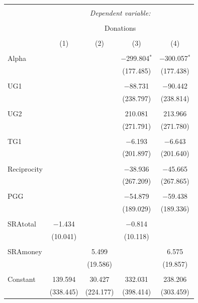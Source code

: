 \documentclass[12pt]{article}
\begin{document}
\begin{table}[!htbp] \centering 
  \caption{} 
  \label{} 
        \begin{adjustbox}{width=\textwidth}
\begin{tabular}{@{\extracolsep{5pt}}lcccc} 
\\[-1.8ex]\hline 
\hline \\[-1.8ex] 
 & \multicolumn{4}{c}{\textit{Dependent variable:}} \\ 
\cline{2-5} 
\\[-1.8ex] & \multicolumn{4}{c}{Donations} \\ 
\\[-1.8ex] & (1) & (2) & (3) & (4)\\ 
\hline \\[-1.8ex] 
 Alpha &  &  & $-$299.804$^{*}$ & $-$300.057$^{*}$ \\ 
  &  &  & (177.485) & (177.438) \\ 
  & & & & \\ 
 UG1 &  &  & $-$88.731 & $-$90.442 \\ 
  &  &  & (238.797) & (238.814) \\ 
  & & & & \\ 
 UG2 &  &  & 210.081 & 213.966 \\ 
  &  &  & (271.791) & (271.780) \\ 
  & & & & \\ 
 TG1 &  &  & $-$6.193 & $-$6.643 \\ 
  &  &  & (201.897) & (201.640) \\ 
  & & & & \\ 
 Reciprocity &  &  & $-$38.936 & $-$45.665 \\ 
  &  &  & (267.209) & (267.865) \\ 
  & & & & \\ 
 PGG &  &  & $-$54.879 & $-$59.438 \\ 
  &  &  & (189.029) & (189.336) \\ 
  & & & & \\ 
 SRAtotal & $-$1.434 &  & $-$0.814 &  \\ 
  & (10.041) &  & (10.118) &  \\ 
  & & & & \\ 
 SRAmoney &  & 5.499 &  & 6.575 \\ 
  &  & (19.586) &  & (19.857) \\ 
  & & & & \\ 
 Constant & 139.594 & 30.427 & 332.031 & 238.206 \\ 
  & (338.445) & (224.177) & (398.414) & (303.459) \\ 

\end{tabular}
\end{adjustbox}
\end{table}
\end{document}
